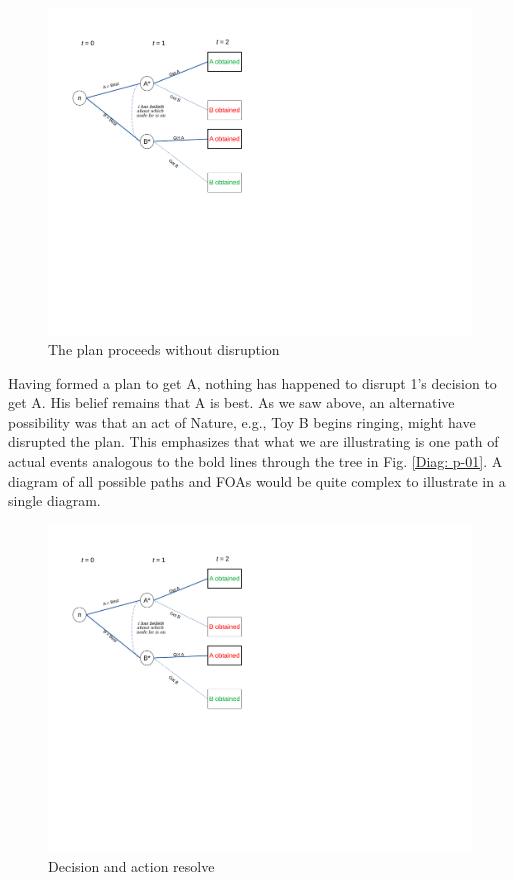 \documentclass[
11pt,
titlepage,
reqno,
]{article}%
\theoremstyle{definition}
\begin{document}
\begin{figure}[h!]
	\centering
	\includegraphics*[page=7,trim = 0 3.5in 2.5in 0in,scale=.80]{Awareness_Diagrams_All}
	\caption{The plan proceeds without disruption\label{Diag: p-07}}%
\end{figure}

Having formed a plan to get A, nothing has happened to disrupt 1's decision to get A. His belief remains that A is best. As we saw above, an alternative possibility was that an act of Nature, e.g., Toy B begins ringing, might have disrupted the plan. This emphasizes that what we are illustrating is one path of actual events analogous to the bold lines through the tree in Fig. \ref{Diag: p-01}. A diagram of all possible paths and FOAs would be quite complex to illustrate in a single diagram. 


\begin{figure}[h!]
	\centering
	\includegraphics*[page=8,trim = 0 2.5in 3in 0in,scale=.85]{Awareness_Diagrams_All}
	\caption{Decision and action resolve\label{Diag: p-08}}%
\end{figure}
\end{document}
